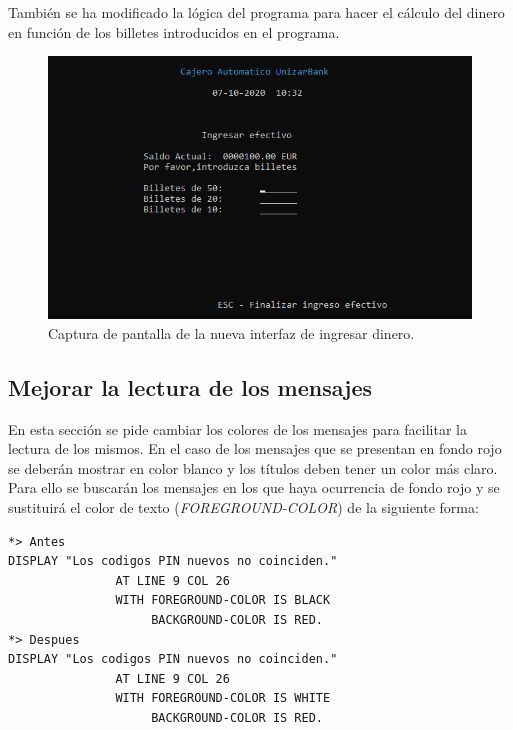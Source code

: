 \documentclass[10pt,a4paper]{article}
\begin{document}
También se ha modificado la lógica del programa para hacer el cálculo del dinero en función de los billetes introducidos en el programa.\\

\begin{figure}[h!]
\centering
\includegraphics[scale=0.75]{images/pantalla_ingreso.png}
\caption{Captura de pantalla de la nueva interfaz de ingresar dinero.}
\label{fig:pantalla_ingreso}
\end{figure}

\newpage
\subsection{Mejorar la lectura de los mensajes}

En esta sección se pide cambiar los colores de los mensajes para facilitar la lectura de los mismos. En el caso de los mensajes que se presentan en fondo rojo se deberán mostrar en color blanco y los títulos deben tener un color más claro.\\

Para ello se buscarán los mensajes en los que haya ocurrencia de fondo rojo y se sustituirá el color de texto (\emph{FOREGROUND-COLOR}) de la siguiente forma:

\begin{lstlisting}
*> Antes
DISPLAY "Los codigos PIN nuevos no coinciden." 
               AT LINE 9 COL 26
               WITH FOREGROUND-COLOR IS BLACK
                    BACKGROUND-COLOR IS RED.
*> Despues
DISPLAY "Los codigos PIN nuevos no coinciden." 
               AT LINE 9 COL 26
               WITH FOREGROUND-COLOR IS WHITE
                    BACKGROUND-COLOR IS RED.
\end{lstlisting}
\end{document}
